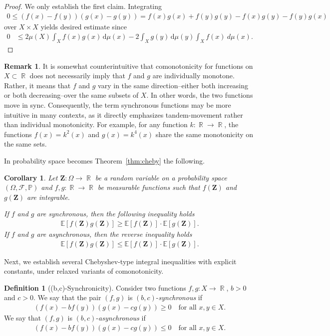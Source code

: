 \documentclass[12pt, reqno]{amsart}%
\theoremstyle{plain}  %
\newtheorem{corollary}[theorem]{Corollary}
\theoremstyle{definition}  %
\newtheorem{definition}[theorem]{Definition}
\newtheorem{remark}[theorem]{Remark}   %
\theoremstyle{remark}
\numberwithin{equation}{section}
\DeclareMathOperator{\R}{\mathbb{R}}
\renewcommand{\d}{\,\mathrm{d}}
\begin{document}
\begin{proof}
We only establish the first claim. Integrating
\begin{align*}
0\leq (f(x) - f(y))(g(x) - g(y))= f(x)g(x)+ f(y)g(y) -f(x)g(y)- f(y)g(x)
\end{align*}
over $X \times X$ yields desired estimate since
\begin{align*}
0&\leq 2\mu(X) \int_X   f(x)g(x) \d \mu(x)- 2\int_Xg(y) \d \mu(y) \int_X  f(x)\ d \mu(x).
\end{align*}
\end{proof}
\begin{remark}
It is somewhat counterintuitive that comonotonicity for functions on $X \subset \R$ does not necessarily imply that $f$ and $g$ are individually monotone. Rather, it means that $f$ and $g$ vary in the same direction--either both increasing or both decreasing--over the same subsets of $X$. In other words, the two functions move in sync. Consequently, the term synchronous functions may be more intuitive in many contexts, as it directly emphasizes tandem-movement rather than individual monotonicity. For example, for any function $k:\R \to \R$, the functions $f(x)= k^2(x)$ and $g(x)= k^{4}(x)$ share the same monotonicity on the same sets. 
\end{remark}
  In probability space becomes Theorem~\ref{thm:cheby} the following.
\begin{corollary}\label{cor:cheby}
Let  $\mathbf{Z}: \Omega \to \R$ be a random variable on a  probability space $(\Omega, \mathcal{F}, \mathbb{P})$ and $f, g : \R \to \R$ be measurable functions such that $f(\mathbf{Z})$ and $g(\mathbf{Z})$ are integrable.

If $f$ and $g$ are synchronous, then the following inequality holds
\begin{align*}
\mathbb{E}[f(\mathbf{Z})g(\mathbf{Z})] \geq \mathbb{E}[f(\mathbf{Z})] \cdot \mathbb{E}[g(\mathbf{Z})].
\end{align*}
If $f$ and $g$ are asynchronous, then the reverse inequality holds
\begin{align*}
\mathbb{E}[f(\mathbf{Z})g(\mathbf{Z})] \leq \mathbb{E}[f(\mathbf{Z})] \cdot \mathbb{E}[g(\mathbf{Z})].
\end{align*}
\end{corollary}
Next, we  establish several Chebyshev-type integral inequalities with explicit constants, under relaxed variants of comonotonicity.
\begin{definition}[(b,c)-Synchronicity]
Consider two functions $f, g: X \to \R$,  $b > 0$ and $c > 0$. We say that  the pair $(f, g)$ is $(b,c)$-\emph{synchronous} if
\begin{align*}
(f(x) - b f(y)) (g(x) - c g(y)) \geq 0 \quad \text{for all } x, y \in X.
\end{align*}
We say that $(f, g)$ is $(b,c)$-\emph{asynchronous} if
\begin{align*}
(f(x) - b f(y)) (g(x) - c g(y)) \leq 0 \quad \text{for all } x, y \in X.
\end{align*}
\end{definition}
\end{document}
